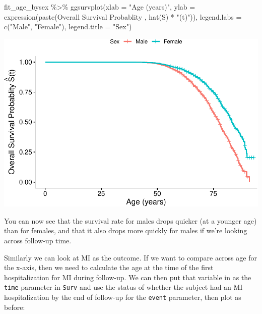 \documentclass[
]{book}
\newenvironment{Shaded}{\begin{snugshade}}{\end{snugshade}}
\newcommand{\AttributeTok}[1]{\textcolor[rgb]{0.77,0.63,0.00}{#1}}
\newcommand{\FunctionTok}[1]{\textcolor[rgb]{0.00,0.00,0.00}{#1}}
\newcommand{\NormalTok}[1]{#1}
\newcommand{\SpecialCharTok}[1]{\textcolor[rgb]{0.00,0.00,0.00}{#1}}
\newcommand{\StringTok}[1]{\textcolor[rgb]{0.31,0.60,0.02}{#1}}
\begin{document}
\begin{Shaded}
\begin{Highlighting}[]
\NormalTok{fit\_age\_bysex }\SpecialCharTok{\%\textgreater{}\%}
  \FunctionTok{ggsurvplot}\NormalTok{(}\AttributeTok{xlab =} \StringTok{"Age (years)"}\NormalTok{,}
             \AttributeTok{ylab =} \FunctionTok{expression}\NormalTok{(}\FunctionTok{paste}\NormalTok{(}\StringTok{\textquotesingle{}Overall Survival Probablity \textquotesingle{}}\NormalTok{,}
                                     \FunctionTok{hat}\NormalTok{(S) }\SpecialCharTok{*} \StringTok{"(t)"}\NormalTok{)),}
             \AttributeTok{legend.labs =} \FunctionTok{c}\NormalTok{(}\StringTok{"Male"}\NormalTok{, }\StringTok{"Female"}\NormalTok{),}
  \AttributeTok{legend.title =} \StringTok{"Sex"}\NormalTok{)}
\end{Highlighting}
\end{Shaded}

\includegraphics{adv_epi_analysis_files/figure-latex/unnamed-chunk-203-2.pdf}

You can now see that the survival rate for males drops quicker (at a younger age) than for females, and that it also drops more quickly for males if we're looking across follow-up time.

Similarly we can look at MI as the outcome. If we want to compare across age for the x-axis, then we need to calculate the age at the time of the first hospitalization for MI during follow-up. We can then put that variable in as the \texttt{time} parameter in \texttt{Surv} and use the status of whether the subject had an MI hospitalization by the end of follow-up for the \texttt{event} parameter, then plot as before:
\end{document}
